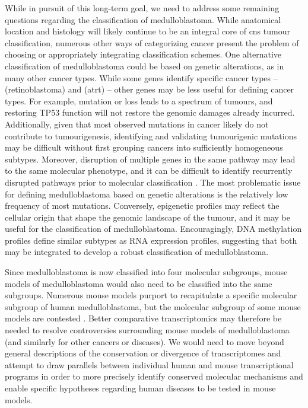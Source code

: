 While in pursuit of this long-term goal, we need to address some remaining questions regarding the classification of medulloblastoma. While anatomical location and histology will likely continue to be an integral core of \gls{cns} tumour classification, numerous other ways of categorizing cancer present the problem of choosing or appropriately integrating classification schemes. One alternative classification of medulloblastoma could be based on genetic alterations, as in many other cancer types. While some genes identify specific cancer types --  (retinoblastoma) and  (\gls{atrt}) -- other genes may be less useful for defining cancer types. For example,  mutation or loss leads to a spectrum of tumours, and restoring TP53 function will not restore the genomic damages already incurred. Additionally, given that most observed mutations in cancer likely do not contribute to tumourigenesis, identifying and validating tumourigenic mutations may be difficult without first grouping cancers into sufficiently homogeneous subtypes. Moreover, disruption of multiple genes in the same pathway may lead to the same molecular phenotype, and it can be difficult to identify recurrently disrupted pathways prior to molecular classification . The most problematic issue for defining medulloblastoma based on genetic alterations is the relatively low frequency of most mutations. Conversely, epigenetic profiles may reflect the cellular origin that shape the genomic landscape of the tumour, and it may be useful for the classification of medulloblastoma. Encouragingly, DNA methylation profiles define similar subtypes as RNA expression profiles, suggesting that both may be integrated to develop a robust classification of medulloblastoma.

Since medulloblastoma is now classified into four molecular subgroups, mouse models of medulloblastoma would also need to be classified into the same subgroups. Numerous mouse models purport to recapitulate a specific molecular subgroup of human medulloblastoma,  but the molecular subgroup of some mouse models are contested . Better comparative transcriptomics may therefore be needed to resolve controversies surrounding mouse models of medulloblastoma (and similarly for other cancers or diseases). We would need to move beyond general descriptions of the conservation or divergence of transcriptomes and attempt to draw parallels between individual human and mouse transcriptional programs in order to more precisely identify conserved molecular mechanisms and enable specific hypotheses regarding human diseases to be tested in mouse models.

